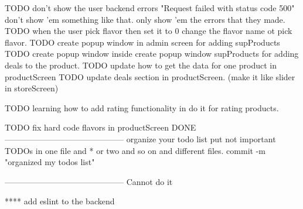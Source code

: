 TODO don't show the user backend errors "Request failed with 
    status code 500" don't show 'em something like that. only 
    show 'em the errors that they made.
TODO when the user pick flavor then set it to 0 change the flavor name ot pick flavor.
TODO create popup window in admin screen for adding supProducts 
TODO create popup window inside create popup window supProducts for adding deals to the product.
TODO update how to get the data for one product in productScreen
TODO update deals section in productScreen. (make it like slider in storeScreen)

TODO learning how to add rating functionality in do it for rating products.

TODO fix hard code flavors in productScreen
DONE
--------------------------------------------
organize your todo list put not important TODOs in one file and * or two and so on and different files.
    commit -m "organized my todos list"



--------------------------------------------
Cannot do it

**** add eslint to the backend
